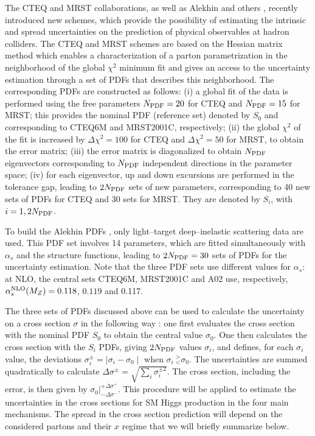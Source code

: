 The CTEQ \cite{CTEQ6} and MRST \cite{MRST2001E} collaborations, as well as
Alekhin \cite{ALEKHIN} and others \cite{Others-PDFs}, recently introduced new
schemes, which provide the possibility of estimating the  intrinsic and spread
uncertainties on the prediction of physical observables at hadron colliders.
The CTEQ and MRST schemes are based on the Hessian matrix method which enables a
characterization of a parton parametrization in the neighborhood of the global
$\chi^2$ minimum fit and gives an access to the uncertainty estimation through
a set of PDFs that describes this neighborhood. The corresponding PDFs are
constructed as follows: (i)  a global fit of the data is performed using the
free parameters $N_{\rm PDF}=20$ for CTEQ and $N_{\rm PDF}=15$ for MRST; this
provides the nominal PDF (reference set) denoted by $S_0$ and corresponding to
CTEQ6M and MRST2001C, respectively; (ii) the global $\chi^2$ of the fit  is
increased by $\Delta \chi^2\!=\!100$ for CTEQ and $\Delta \chi^2\!=\!50$ for
MRST, to obtain the error matrix; (iii) the error matrix is diagonalized to
obtain $N_{\rm PDF}$ eigenvectors corresponding to $N_{\rm PDF}$ independent
directions in the parameter space; (iv) for each eigenvector, up and down
excursions are performed in the tolerance gap, leading to $2N_{\rm PDF}$ sets
of new parameters, corresponding to 40 new sets of PDFs for CTEQ and 30 sets
for MRST.  They are denoted by $S_i$, with $i=1, 2N_{\rm PDF}$. \s 

To build the Alekhin PDFs \cite{ALEKHIN}, only light--target  deep--inelastic
scattering data are used. This PDF set involves 14 parameters, which are fitted
simultaneously with $\alpha_s$ and the structure functions, leading to $2N_{\rm
PDF}=30$  sets of PDFs for the uncertainty estimation. Note that the three PDF
sets use different values for  $\alpha_s$: at NLO, the central sets CTEQ6M, 
MRST2001C and A02 use, respectively, $\alpha_s^{\rm NLO}(M_Z)= 0.118$, $0.119$  and 0.117.\s 

The three sets of PDFs discussed above can be used to calculate the uncertainty
on a cross section $\sigma$ in the following way \cite{Samir}: one first
evaluates the cross section with the nominal PDF $S_0$ to obtain  the central
value $\sigma_0$. One then calculates the cross section with  the $S_i$ PDFs,
giving $2N_{\rm PDF}$ values $\sigma_i$, and defines, for each $\sigma_i$
value, the deviations  $\sigma_i^\pm =\mid \sigma_i -\sigma_0\mid$ when
$\sigma_i \ ^{>}_{<}  \sigma_0$. The uncertainties are summed quadratically to
calculate {\bf $\Delta  \sigma^\pm  = \sqrt{ \sum_i \sigma_i^{\pm 2} }$}.  The
cross section, including the error, is then given by $\sigma_0|^{+\Delta
\sigma^+}_{- \Delta \sigma^-}$.  This procedure will be applied to estimate the
uncertainties in the cross sections for SM Higgs production in the four main
mechanisms.  The spread in the cross section prediction will depend on the
considered partons and their $x$ regime that we will briefly summarize below. \s

